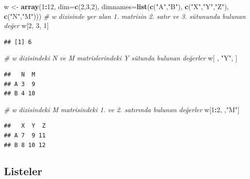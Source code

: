 \documentclass[
]{book}
\newenvironment{Shaded}{\begin{snugshade}}{\end{snugshade}}
\newcommand{\AttributeTok}[1]{\textcolor[rgb]{0.13,0.29,0.53}{#1}}
\newcommand{\CommentTok}[1]{\textcolor[rgb]{0.56,0.35,0.01}{\textit{#1}}}
\newcommand{\DecValTok}[1]{\textcolor[rgb]{0.00,0.00,0.81}{#1}}
\newcommand{\FunctionTok}[1]{\textcolor[rgb]{0.13,0.29,0.53}{\textbf{#1}}}
\newcommand{\NormalTok}[1]{#1}
\newcommand{\OtherTok}[1]{\textcolor[rgb]{0.56,0.35,0.01}{#1}}
\newcommand{\SpecialCharTok}[1]{\textcolor[rgb]{0.81,0.36,0.00}{\textbf{#1}}}
\newcommand{\StringTok}[1]{\textcolor[rgb]{0.31,0.60,0.02}{#1}}
\begin{document}
\begin{Shaded}
\begin{Highlighting}[]
\NormalTok{w }\OtherTok{\textless{}{-}} \FunctionTok{array}\NormalTok{(}\DecValTok{1}\SpecialCharTok{:}\DecValTok{12}\NormalTok{, }\AttributeTok{dim=}\FunctionTok{c}\NormalTok{(}\DecValTok{2}\NormalTok{,}\DecValTok{3}\NormalTok{,}\DecValTok{2}\NormalTok{), }
           \AttributeTok{dimnames=}\FunctionTok{list}\NormalTok{(}\FunctionTok{c}\NormalTok{(}\StringTok{"A"}\NormalTok{,}\StringTok{"B"}\NormalTok{), }\FunctionTok{c}\NormalTok{(}\StringTok{"X"}\NormalTok{,}\StringTok{"Y"}\NormalTok{,}\StringTok{"Z"}\NormalTok{), }\FunctionTok{c}\NormalTok{(}\StringTok{"N"}\NormalTok{,}\StringTok{"M"}\NormalTok{))) }
\CommentTok{\# w dizisinde yer alan 1. matrisin 2. satır ve 3. sütununda bulunan değer}
\NormalTok{w[}\DecValTok{2}\NormalTok{, }\DecValTok{3}\NormalTok{, }\DecValTok{1}\NormalTok{]}
\end{Highlighting}
\end{Shaded}

\begin{verbatim}
## [1] 6
\end{verbatim}

\begin{Shaded}
\begin{Highlighting}[]
\CommentTok{\# w dizisindeki N ve M matrislerindeki Y sütunda bulunan değerler}
\NormalTok{w[ , }\StringTok{"Y"}\NormalTok{, ]}
\end{Highlighting}
\end{Shaded}

\begin{verbatim}
##   N  M
## A 3  9
## B 4 10
\end{verbatim}

\begin{Shaded}
\begin{Highlighting}[]
\CommentTok{\# w dizisindeki M matrisindeki 1. ve 2. satırında bulunan değerler}
\NormalTok{w[}\DecValTok{1}\SpecialCharTok{:}\DecValTok{2}\NormalTok{, ,}\StringTok{"M"}\NormalTok{] }
\end{Highlighting}
\end{Shaded}

\begin{verbatim}
##   X  Y  Z
## A 7  9 11
## B 8 10 12
\end{verbatim}

\subsection{Listeler}\label{listeler}
\end{document}
